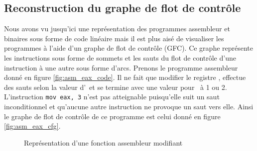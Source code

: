 \subsection{Reconstruction du graphe de flot de contrôle}
Nous avons vu jusqu'ici une représentation des programmes assembleur et binaires sous forme de code linéaire mais il est plus aisé de visualiser les programmes à l'aide d'un graphe de flot de contrôle (GFC).
Ce graphe représente les instructions sous forme de sommets et les sauts du flot de contrôle d'une instruction à une autre sous forme d'arcs.
Prenons le programme assembleur donné en figure \ref{fig:asm_eax_code}. Il ne fait que modifier le registre \eax, effectue des sauts selon la valeur d'\eax\ et se termine avec une valeur pour \eax\ à 1 ou 2. L'instruction \texttt{mov eax, 3} n'est pas atteignable puisqu'elle suit un saut inconditionnel et qu'aucune autre instruction ne provoque un saut vers elle.
Ainsi le graphe de flot de contrôle de ce programme est celui donné en figure \ref{fig:asm_eax_cfg}.


\begin{figure}[h]
\begin{center}
\end{center}
\caption{Représentation d'une fonction assembleur modifiant \eax}
\label{fig:asm_eax}
\end{figure}

